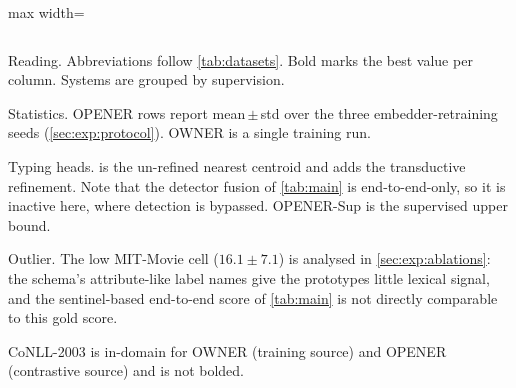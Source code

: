 \begin{table}[tp]
\begin{adjustbox}{max width=\textwidth}
\begin{threeparttable}
\begin{tabular}{l*{13}{c}c}
\bottomrule
\end{tabular}
\begin{tablenotes}[flushleft]
\footnotesize
\item[] Reading. Abbreviations follow \autoref{tab:datasets}. Bold marks the best value per column. Systems are grouped by supervision.
\item[] Statistics. OPENER rows report mean\,$\pm$\,std over the three embedder-retraining seeds (\autoref{sec:exp:protocol}). OWNER is a single training run.
\item[] Typing heads. \zsind is the un-refined nearest centroid and \zstr adds the transductive refinement. Note that the detector fusion of \autoref{tab:main} is end-to-end-only, so it is inactive here, where detection is bypassed. OPENER-Sup is the supervised upper bound.
\item[] Outlier. The low \zsind MIT-Movie cell ($16.1 \pm 7.1$) is analysed in \autoref{sec:exp:ablations}: the schema's attribute-like label names give the prototypes little lexical signal, and the sentinel-based end-to-end score of \autoref{tab:main} is not directly comparable to this gold score.
\item[$\dagger$] CoNLL-2003 is in-domain for OWNER (training source) and OPENER (contrastive source) and is not bolded.
\end{tablenotes}
\end{threeparttable}
\end{adjustbox}
\end{table}

